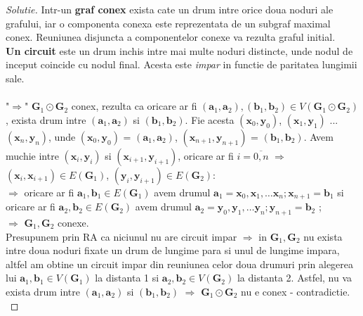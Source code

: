 \documentclass[12pt]{article}
\begin{document}
\begin{proof}[Solutie]
Intr-un \textbf{graf conex} exista cate un drum intre orice doua noduri ale grafului, iar o componenta conexa este reprezentata de un subgraf maximal conex. Reuniunea disjuncta a componentelor conexe va rezulta graful initial. \\
\textbf{Un circuit} este un drum inchis intre mai multe noduri distincte, unde nodul de inceput coincide cu nodul final. Acesta este \textit{impar} in functie de paritatea lungimii sale. \\\\
"\(\Longrightarrow\)" \(\mathbf{G}_{1}\odot{\mathbf{G}_{2}}\) conex, rezulta ca oricare ar fi \((\mathbf{a}_{1}, \mathbf{a}_{2}), (\mathbf{b}_{1}, \mathbf{b}_{2})\in{V(\mathbf{G}_{1}\odot{\mathbf{G}_{2}})}\), exista drum intre \((\mathbf{a}_{1}, \mathbf{a}_{2})\) si \((\mathbf{b}_{1}, \mathbf{b}_{2})\). Fie acesta \((\mathbf{x}_{0}, \mathbf{y}_{0})\), \((\mathbf{x}_{1}, \mathbf{y}_{1})\) ... \((\mathbf{x}_{n}, \mathbf{y}_{n})\), unde \((\mathbf{x}_{0}, \mathbf{y}_{0})\) = \((\mathbf{a}_{1}, \mathbf{a}_{2})\), \((\mathbf{x}_{n+1}, \mathbf{y}_{n+1})\) = \((\mathbf{b}_{1}, \mathbf{b}_{2})\). Avem muchie intre \((\mathbf{x}_{i}, \mathbf{y}_{i})\) si \((\mathbf{x}_{i+1}, \mathbf{y}_{i+1})\), oricare ar fi \(i=\overline{0, n}\) \(\Rightarrow\) \((\mathbf{x}_{i}, \mathbf{x}_{i+1})\in{E(\mathbf{G}_{1})}\), \((\mathbf{y}_{i}, \mathbf{y}_{i+1})\in{E(\mathbf{G}_{2})}\):\\
\(\Rightarrow\) oricare ar fi \(\mathbf{a}_{1}, \mathbf{b}_{1}\in{E(\mathbf{G}_{1})}\) avem drumul \(\mathbf{a}_{1} = \mathbf{x}_{0}, \mathbf{x}_{1}, \ldots \mathbf{x}_{n}; \mathbf{x}_{n+1} = \mathbf{b}_{1}\) si  oricare ar fi \(\mathbf{a}_{2}, \mathbf{b}_{2}\in{E(\mathbf{G}_{2})}\) avem drumul \(\mathbf{a}_{2} = \mathbf{y}_{0}, \mathbf{y}_{1}, \ldots \mathbf{y}_{n}; \mathbf{y}_{n+1} = \mathbf{b}_{2}\) ;\\
\(\Rightarrow\) \(\mathbf{G}_{1}, \mathbf{G}_{2}\) conexe.\\
Presupunem prin RA ca niciunul nu are circuit impar \(\Rightarrow\) in \(\mathbf{G}_{1}, \mathbf{G}_{2}\) nu exista intre doua noduri fixate un drum de lungime para si unul de lungime impara, altfel am obtine un circuit impar din reuniunea celor doua drumuri prin alegerea lui  \(\mathbf{a}_{1}, \mathbf{b}_{1}\in{V(\mathbf{G}_{1})}\) la distanta 1 si \(\mathbf{a}_{2}, \mathbf{b}_{2}\in{V(\mathbf{G}_{2})}\) la distanta 2. Astfel, nu va exista drum intre \((\mathbf{a}_{1}, \mathbf{a}_{2})\) si \((\mathbf{b}_{1}, \mathbf{b}_{2})\) \(\Rightarrow\) \(\mathbf{G}_{1}\odot{\mathbf{G}_{2}}\) nu e conex - contradictie.\\

\end{proof}
\end{document}
